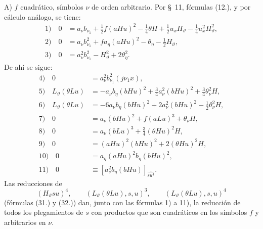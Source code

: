 \documentclass[11pt]{article}
\begin{document}
A) $f$ cuadrático, símbolos $\nu$ de orden arbitrario. Por \S\ 11, fórmulas (12.), y por cálculo análogo, se tiene:
\begin{align*}
1)\quad 0&=a_\nu b_{\nu_1}+\frac12f(aHu)^2-\frac14\theta H+\frac12u_xH_\vartheta-\frac14u_x^2H_\vartheta^2,\\
2)\quad 0&=a_\nu b_{\nu_1}^2+f a_\eta(aHu)^2-\theta_\eta-\frac12H_\vartheta,\\
3)\quad 0&=a_\nu^2b_{\nu_1}^2-H_\vartheta^2+2\theta_\eta^2.
\end{align*}
De ahí se sigue:
\begin{align*}
4)\quad 0&=a_\nu^2b_{\nu_1}^2(j\nu_1x),\\
5)\quad L_\vartheta(\theta Lu)&=-a_\nu b_\eta(bHu)^2+\frac34a_\nu^2(bHu)^2+\frac34\theta_\nu^2H,\\
6)\quad L_\vartheta(\theta Lu)&=-6a_\nu b_\eta(bHu)^2+2a_\nu^2(bHu)^2-\frac12\theta_\nu^2H,\\
7)\quad 0&=a_\nu(bHu)^2+f(aLu)^3+\theta_\nu H,\\
8)\quad 0&=a_\nu(bLu)^3+\frac34(\theta Hu)^2H,\\
9)\quad 0&=(aHu)^2(bHu)^2+2(\theta Hu)^2H,\\
10)\quad 0&=a_\eta(aHu)^2b_\eta(bHu)^2,\\
11)\quad 0&\equiv [a_\nu^2b_\eta(bHu)]_{\widehat{su^4}}.
\end{align*}
Las reducciones de
\[
(H_\vartheta su)^4,
\qquad (L_\vartheta(\theta Lu),s,u)^3,
\qquad (L_\vartheta(\theta Lu),s,u)^4
\]
(fórmulas (31.) y (32.)) dan, junto con las fórmulas 1) a 11), la reducción de todos los plegamientos de $s$ con productos que son cuadráticos en los símbolos $f$ y arbitrarios en $\nu$.
\end{document}
